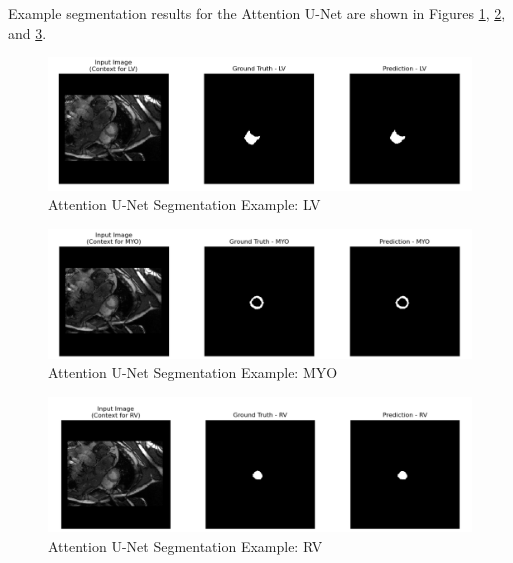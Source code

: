 \documentclass{article}
\begin{document}
Example segmentation results for the Attention U-Net are shown in Figures \ref{fig:attention_unet_example_lv}, \ref{fig:attention_unet_example_myo}, and \ref{fig:attention_unet_example_rv}.
\begin{figure}[H]
  \centering
  \includegraphics[width=\linewidth]{../result/for_ppt/attention_LV.png}
  \caption{Attention U-Net Segmentation Example: LV}
  \label{fig:attention_unet_example_lv}
\end{figure}
\begin{figure}[H]
  \centering
  \includegraphics[width=\linewidth]{../result/for_ppt/attention_MYO.png}
  \caption{Attention U-Net Segmentation Example: MYO}
  \label{fig:attention_unet_example_myo}
\end{figure}
\begin{figure}[H]
  \centering
  \includegraphics[width=\linewidth]{../result/for_ppt/attention_RV.png}
  \caption{Attention U-Net Segmentation Example: RV}
  \label{fig:attention_unet_example_rv}
\end{figure}
\end{document}
